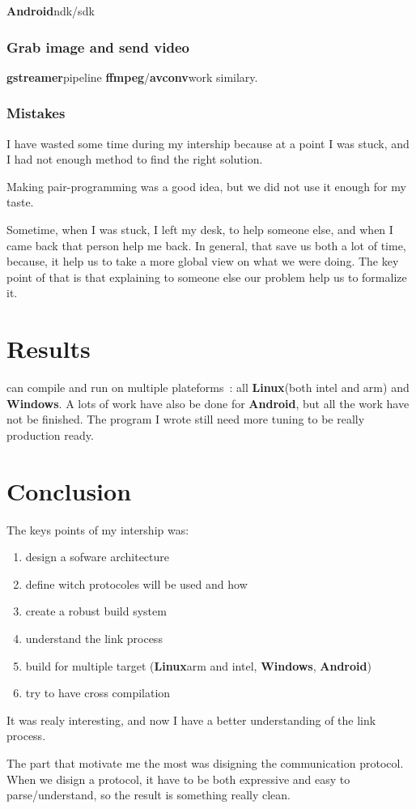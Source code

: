 \documentclass[a4paper,11pt]{custom}
\newcommand{\avconv}{\textbf{avconv}}
\newcommand{\ffmpeg}{\textbf{ffmpeg}}
\newcommand{\gstreamer}{\textbf{gstreamer}}
\newcommand{\linux}{\textbf{Linux}}
\newcommand{\win}{\textbf{Windows}}
\newcommand{\android}{\textbf{Android}}
\begin{document}
\android ndk/sdk

\subsection{Grab image and send video}

\gstreamer pipeline
\ffmpeg/\avconv work similary.

\subsection{Mistakes}

I have wasted some time during my intership because at a point I was stuck, and
I had not enough method to find the right solution.

Making pair-programming was a good idea, but we did not use it enough for my
taste.

Sometime, when I was stuck, I left my desk, to help someone else, and when I
came back that person help me back. In general, that save us both a lot of time,
because, it help us to take a more global view on what we were doing. The key
point of that is that explaining to someone else our problem help us to
formalize it.

\chapter{Results}

can compile and run on multiple plateforms~: all \linux (both intel and arm) and
\win. A lots of work have also be done for \android, but all the work have
not be finished.
The program I wrote still need more tuning to be really production ready.



\chapter{Conclusion}

The keys points of my intership was:
\begin{enumerate}
\item design a sofware architecture
\item define witch protocoles will be used and how
\item create a robust build system
\item understand the link process
\item build for multiple target (\linux arm and intel, \win, \android)
\item try to have cross compilation
\end{enumerate}

It was realy interesting, and now I have a better understanding of the link
process.

The part that motivate me the most was disigning the communication protocol.
When we disign a protocol, it have to be both expressive and easy to
parse/understand, so the result is something really clean.
\end{document}
